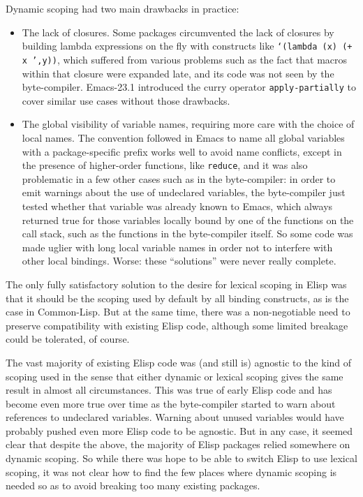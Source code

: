 \documentclass[format=acmsmall, review=false, screen=true]{acmart}
\newcommand \Elisp {Elisp}
\begin{document}
Dynamic scoping had two main drawbacks in practice:
\begin{itemize}
\item The lack of closures.  Some packages circumvented the lack of closures
  by building lambda expressions on the fly with constructs like
  \texttt{`(lambda (x) (+ x ',y))}, which suffered from various problems
  such as the fact that macros within that closure were expanded late, and
  its code was not seen by the byte-compiler.  Emacs-23.1 introduced the
  curry operator \texttt{apply-partially} to cover similar use cases without
  those drawbacks.
\item The global visibility of variable names, requiring more care with the
  choice of local names.  The convention followed in Emacs to name all
  global variables with a package-specific prefix works well to avoid name
  conflicts, except in the presence of higher-order functions, like
  \texttt{reduce}, and it was also problematic in a few other cases such as
  in the byte-compiler: in order to emit warnings about the use of
  undeclared variables, the byte-compiler just tested whether that variable
  was already known to Emacs, which always returned true for those variables
  locally bound by one of the functions on the call stack, such as the
  functions in the byte-compiler itself.  So some code was made uglier with
  long local variable names in order not to interfere with other local
  bindings.  Worse: these ``solutions'' were never really complete.
\end{itemize}

The only fully satisfactory solution to the desire for lexical scoping in
\Elisp{} was that it should be the scoping used by default by all binding
constructs, as is the case in Common-Lisp.  But at the same time, there was
a non-negotiable need to preserve compatibility with existing \Elisp{} code,
although some limited breakage could be tolerated, of course.

The vast majority of existing \Elisp{} code was (and still is) agnostic to
the kind of scoping used in the sense that either dynamic or lexical scoping
gives the same result in almost all circumstances.  This was true of early
\Elisp{} code and has become even more true over time as the byte-compiler
started to warn about references to undeclared variables.  Warning about
unused variables would have probably pushed even more \Elisp{} code to be
agnostic.  But in any case, it seemed clear that despite the above, the
majority of Elisp packages relied somewhere on dynamic scoping.  So while
there was hope to be able to switch \Elisp{} to use lexical scoping, it was
not clear how to find the few places where dynamic scoping is needed so as
to avoid breaking too many existing packages.
\end{document}
